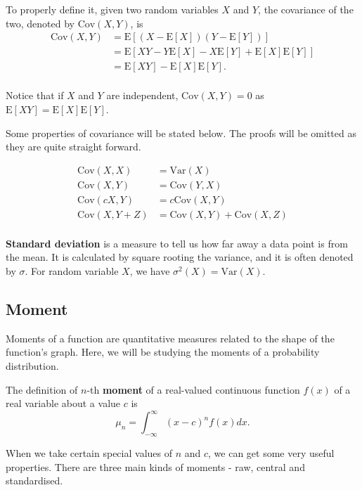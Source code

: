 \documentclass[11pt, a4paper, oneside]{book}
\theoremstyle{definition}
\newcommand{\var}[1]{\text{Var}(#1)}
\newcommand{\cov}[1]{\text{Cov}(#1)}
\newcommand{\E}[1]{\text{E}[#1]}
\begin{document}
\noindent To properly define it, given two random variables $X$ and $Y$, the covariance of the two, denoted by $\cov{X,Y}$, is\begin{equation*}
\begin{split}
\cov{X,Y} &= \E{(X - \E{X})(Y - \E{Y})} \\
&= \E{XY - Y\E{X} - X\E{Y}+\E{X}\E{Y}} \\
&= \E{XY} - \E{X}\E{Y}. \\
\end{split}
\end{equation*}

\noindent Notice that if $X$ and $Y$ are independent, $\cov{X,Y} = 0$ as $\E{XY} = \E{X}\E{Y}$.

\noindent Some properties of covariance will be stated below. The proofs will be omitted as they are quite straight forward.

\begin{equation*}
\begin{split}
\cov{X,X} &= \var{X} \\
\cov{X,Y} &= \cov{Y,X} \\
\cov{cX,Y} &= c\cov{X,Y} \\
\cov{X,Y+Z} &= \cov{X,Y} + \cov{X,Z} \\
\end{split}
\end{equation*}

\noindent \textbf{Standard deviation} is a measure to tell us how far away a data point is from the mean. It is calculated by square rooting the variance, and it is often denoted by $\sigma$. For random variable $X$, we have $\sigma^2(X) = \var{X}$.

\subsection{Moment}

\noindent Moments of a function are quantitative measures related to the shape of the function's graph. Here, we will be studying the moments of a probability distribution. 

\noindent The definition of $n$-th \textbf{moment} of a real-valued continuous function $f(x)$ of a real variable about a value $c$ is\[
\mu_n = \int_{-\infty}^{\infty}(x-c)^nf(x) dx.
\]

\noindent When we take certain special values of $n$ and $c$, we can get some very useful properties. There are three main kinds of moments - raw, central and standardised. 
\end{document}
